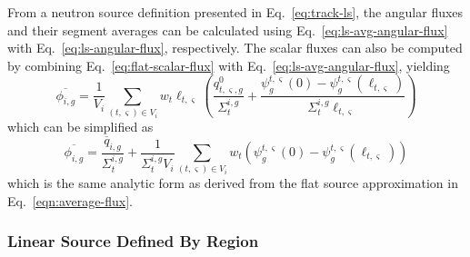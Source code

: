 From a neutron source definition presented in Eq.~\ref{eq:track-ls}, the angular fluxes and their segment averages can be calculated using Eq.~\ref{eq:ls-avg-angular-flux} with Eq.~\ref{eq:ls-angular-flux}, respectively. The scalar fluxes can also be computed by combining Eq.~\ref{eq:flat-scalar-flux} with Eq.~\ref{eq:ls-avg-angular-flux}, yielding
\begin{equation}
\overline{\phi_{i,g}} = \frac{1}{V_i} \sum_{(t,\varsigma) \in V_i} w_t \ell_{t,\varsigma} \left( \frac{q^0_{t,\varsigma,g}}{\Sigma_{t}^{i,g}} + \frac{\psi^{t,\varsigma}_g(0) - \psi^{t,\varsigma}_g(\ell_{t,\varsigma})}{\Sigma_{t}^{i,g} \ell_{t,\varsigma}} \right)
\end{equation}
which can be simplified as
\begin{equation}
\overline{\phi_{i,g}} = \frac{\overline{q}_{i,g}}{\Sigma_{t}^{i,g}} + \frac{1}{\Sigma_{t}^{i,g} V_i} \sum_{(t,\varsigma) \in V_i} w_t \left(\psi^{t,\varsigma}_g(0) - \psi^{t,\varsigma}_g(\ell_{t,\varsigma}) \right)
\label{eq:ls-avg-scalar-flux}
\end{equation}
which is the same analytic form as derived from the flat source approximation in Eq.~\ref{eqn:average-flux}.

\subsubsection{Linear Source Defined By Region}


